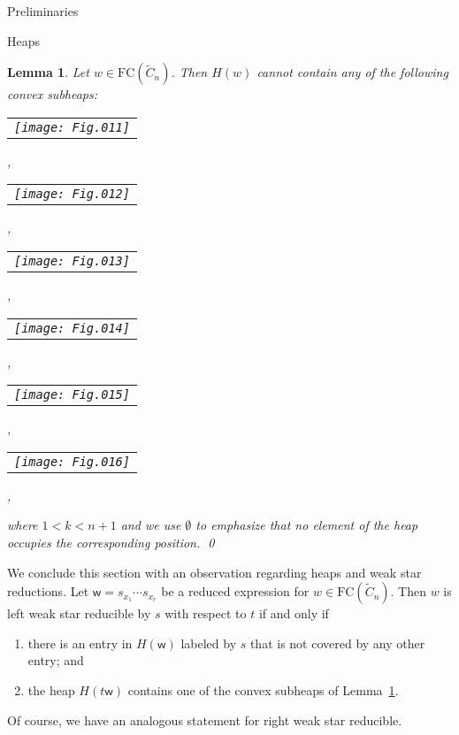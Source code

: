 \documentclass[12pt]{amsart}
\newtheorem{lem}[thm]{Lemma}
\newcommand{\C}{\widetilde{C}}
\renewcommand{\(}{\left(}
\renewcommand{\)}{\right)}
\newcommand{\w}{\mathsf{w}}
\newcommand{\FC}{\mathrm{FC}}
\begin{document}
\begin{section}{Preliminaries}
\begin{subsection}{Heaps}
\begin{lem}\label{lem:impermissible.heap.configs}
Let $w \in \FC(\C_{n})$.  Then $H(w)$ cannot contain any of the following convex subheaps:
\begin{center}
\begin{tabular}[c]{c}
\texttt{[image: Fig.011]}
\end{tabular},
\begin{tabular}[c]{c}
\texttt{[image: Fig.012]}
\end{tabular},
\begin{tabular}[c]{c}
\texttt{[image: Fig.013]}
\end{tabular},
\begin{tabular}[c]{c}
\texttt{[image: Fig.014]}
\end{tabular},
\begin{tabular}[c]{c}
\texttt{[image: Fig.015]}
\end{tabular},
\begin{tabular}[c]{c}
\texttt{[image: Fig.016]}
\end{tabular},
\end{center}
where $1<k<n+1$ and we use $\emptyset$ to emphasize that no element of the heap occupies the corresponding position.  \qed
\end{lem}

We conclude this section with an observation regarding heaps and weak star reductions.  Let $\w=s_{x_1}\cdots s_{x_r}$ be a reduced expression for $w \in \FC(\C_{n})$.  Then $w$ is left weak star reducible by $s$ with respect to $t$ if and only if
\begin{enumerate}
\item there is an entry in $H(\w)$ labeled by $s$ that is not covered by any other entry; and

\item the heap $H(t\w)$ contains one of the convex subheaps of Lemma~\ref{lem:impermissible.heap.configs}.
\end{enumerate}
Of course, we have an analogous statement for right weak star reducible.

\end{subsection}

\end{section}

\end{document}

